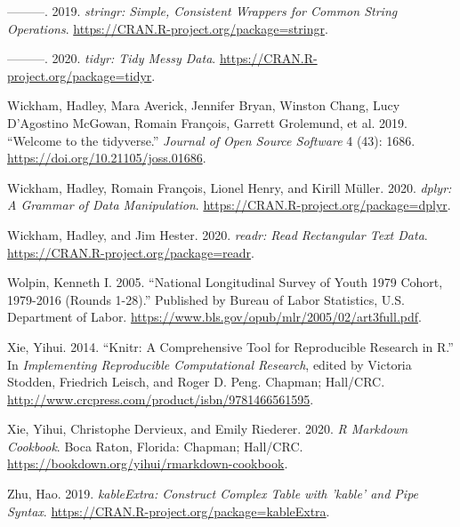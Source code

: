 \documentclass{article}
\begin{document}
\leavevmode\hypertarget{ref-stringr}{}%
---------. 2019. \emph{stringr: Simple, Consistent Wrappers for Common String Operations}. \url{https://CRAN.R-project.org/package=stringr}.

\leavevmode\hypertarget{ref-tidyr}{}%
---------. 2020. \emph{tidyr: Tidy Messy Data}. \url{https://CRAN.R-project.org/package=tidyr}.

\leavevmode\hypertarget{ref-tidyverse}{}%
Wickham, Hadley, Mara Averick, Jennifer Bryan, Winston Chang, Lucy D'Agostino McGowan, Romain François, Garrett Grolemund, et al. 2019. ``Welcome to the tidyverse.'' \emph{Journal of Open Source Software} 4 (43): 1686. \url{https://doi.org/10.21105/joss.01686}.

\leavevmode\hypertarget{ref-dplyr}{}%
Wickham, Hadley, Romain François, Lionel Henry, and Kirill Müller. 2020. \emph{dplyr: A Grammar of Data Manipulation}. \url{https://CRAN.R-project.org/package=dplyr}.

\leavevmode\hypertarget{ref-readr}{}%
Wickham, Hadley, and Jim Hester. 2020. \emph{readr: Read Rectangular Text Data}. \url{https://CRAN.R-project.org/package=readr}.

\leavevmode\hypertarget{ref-nlsy79edu}{}%
Wolpin, Kenneth I. 2005. ``National Longitudinal Survey of Youth 1979 Cohort, 1979-2016 (Rounds 1-28).'' Published by Bureau of Labor Statistics, U.S. Department of Labor. \url{https://www.bls.gov/opub/mlr/2005/02/art3full.pdf}.

\leavevmode\hypertarget{ref-knitr}{}%
Xie, Yihui. 2014. ``Knitr: A Comprehensive Tool for Reproducible Research in R.'' In \emph{Implementing Reproducible Computational Research}, edited by Victoria Stodden, Friedrich Leisch, and Roger D. Peng. Chapman; Hall/CRC. \url{http://www.crcpress.com/product/isbn/9781466561595}.

\leavevmode\hypertarget{ref-rmarkdown}{}%
Xie, Yihui, Christophe Dervieux, and Emily Riederer. 2020. \emph{R Markdown Cookbook}. Boca Raton, Florida: Chapman; Hall/CRC. \url{https://bookdown.org/yihui/rmarkdown-cookbook}.

\leavevmode\hypertarget{ref-kableExtra}{}%
Zhu, Hao. 2019. \emph{kableExtra: Construct Complex Table with 'kable' and Pipe Syntax}. \url{https://CRAN.R-project.org/package=kableExtra}.



\end{document}
